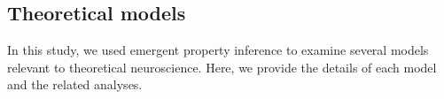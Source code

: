 \documentclass[11pt]{article}
\DeclareMathOperator*{\argmin}{argmin}
\DeclareMathOperator*{\argmax}{argmax}
\begin{document}



\subsection{Theoretical models}\label{methods_theoretical_models}
In this study, we used emergent property inference to examine several models relevant to theoretical neuroscience.  Here, we provide the details of each model  and the related analyses.
\end{document}
